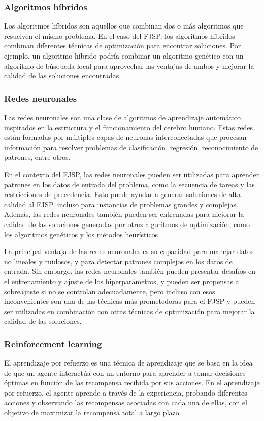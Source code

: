 \subsubsection{Algoritmos híbridos}
Los algoritmos híbridos son aquellos que combinan dos o más algoritmos que resuelven el mismo problema. 
En el caso del FJSP, los algoritmos híbridos combinan diferentes técnicas de optimización para encontrar 
soluciones. Por ejemplo, un algoritmo híbrido podría combinar un algoritmo genético con un algoritmo de 
búsqueda local para aprovechar las ventajas de ambos y mejorar la calidad de las soluciones encontradas.

\subsubsection{Redes neuronales}
Las redes neuronales son una clase de algoritmos de aprendizaje automático inspirados en la 
estructura y el funcionamiento del cerebro humano. Estas redes están formadas por múltiples 
capas de neuronas interconectadas que procesan información para resolver problemas de clasificación, 
regresión, reconocimiento de patrones, entre otros.\medskip

En el contexto del FJSP, las redes neuronales pueden ser utilizadas para aprender patrones en los datos
de entrada del problema, como la secuencia de tareas y las restricciones de precedencia. Esto puede 
ayudar a generar soluciones de alta calidad al FJSP, incluso para instancias de problemas grandes y 
complejas. Además, las redes neuronales también pueden ser entrenadas para mejorar la calidad de las 
soluciones generadas por otros algoritmos de optimización, como los algoritmos genéticos y los métodos 
heurísticos.\medskip

La principal ventaja de las redes neuronales es su capacidad para manejar datos no lineales y ruidosos, 
y para detectar patrones complejos en los datos de entrada. Sin embargo, las redes neuronales también 
pueden presentar desafíos en el entrenamiento y ajuste de los hiperparámetros, y pueden ser propensas 
a sobreajuste si no se controlan adecuadamente, pero incluso con esos inconvenientes son una de las 
técnicas más prometedoras para el FJSP y pueden ser utilizadas en combinación con otras técnicas de 
optimización para mejorar la calidad de las soluciones.

\subsubsection{Reinforcement learning}
El aprendizaje por refuerzo es una técnica de aprendizaje que se basa en la idea de que un agente 
interactúa con un entorno para aprender a tomar decisiones óptimas en función de las recompensa 
recibida por sus acciones. En el aprendizaje por refuerzo, el agente aprende a través de la 
experiencia, probando diferentes acciones y observando las recompensas asociadas con cada una 
de ellas, con el objetivo de maximizar la recompensa total a largo plazo.\medskip

